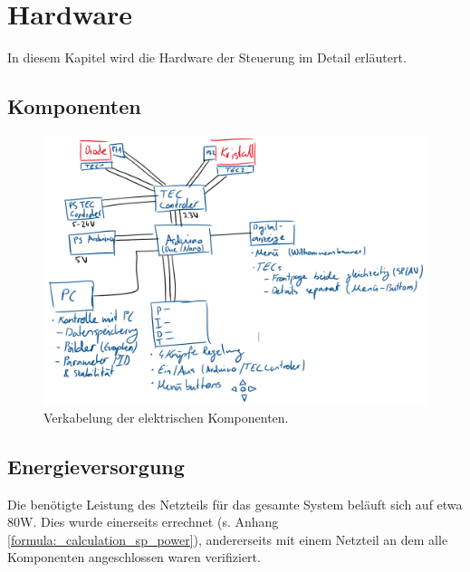 \section{Hardware}
In diesem Kapitel wird die Hardware der Steuerung im Detail erläutert.


\subsection{Komponenten}
\begin{figure}[H]
    \centering
    \includegraphics[scale=0.5]{98_images/scheme_wiring.PNG}
    \caption{Verkabelung der elektrischen Komponenten.}
    \label{fig:scheme_wiring}
\end{figure}

\subsection{Energieversorgung}  %
Die benötigte Leistung des Netzteils für das gesamte System beläuft sich auf etwa 80W.
Dies wurde einerseits errechnet (s. Anhang \ref{formula:_calculation_sp_power}), andererseits mit einem Netzteil an dem alle Komponenten angeschlossen waren verifiziert.


